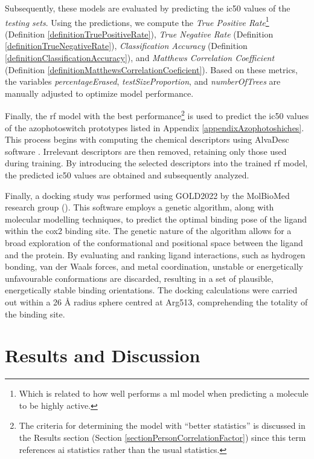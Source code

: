 \documentclass[11pt]{article}
\begin{document}
Subsequently, these models are evaluated by predicting the \gls{ic50} values of the \emph{testing sets}. Using the predictions, we compute the \emph{True Positive Rate}\footnote{Which is related to how well performs a \gls{ml} model when predicting a molecule to be highly active. } (Definition \ref{definitionTruePositiveRate}), \emph{True Negative Rate} (Definition \ref{definitionTrueNegativeRate}), \emph{Classification Accuracy} (Definition \ref{definitionClassificationAccuracy}), and \emph{Matthews Correlation Coefficient} (Definition \ref{definitionMatthewsCorrelationCoeficient}). Based on these metrics, the variables \emph{percentageErased}, \emph{testSizeProportion}, and \emph{numberOfTrees} are manually adjusted to optimize model performance.

Finally, the \gls{rf} model with the best performance\footnote{The criteria for determining the model with “better statistics” is discussed in the Results section (Section \ref{sectionPersonCorrelationFactor}) since this term references \gls{ai} statistics rather than the usual statistics.} is used to predict the \gls{ic50} values of the azophotoswitch prototypes listed in Appendix \ref{appendixAzophotoshiches}. This process begins with computing the chemical descriptors using AlvaDesc software \cite{MauriMolecularDescriptorsBook}. Irrelevant descriptors are then removed, retaining only those used during training. By introducing the selected descriptors into the trained \gls{rf} model, the predicted \gls{ic50} values are obtained and subsequently analyzed.

Finally, a docking study was performed using GOLD2022 \cite{GoldReference} by the MolBioMed research group (\cite{molbiomed}). This software employs a genetic algorithm, along with molecular modelling techniques, to predict the optimal binding pose of the ligand within the \gls{cox2} binding site. The genetic nature of the algorithm allows for a broad exploration of the conformational and positional space between the ligand and the protein. By evaluating and ranking ligand interactions, such as hydrogen bonding, van der Waals forces, and metal coordination, unstable or energetically unfavourable conformations are discarded, resulting in a set of plausible, energetically stable binding orientations. The docking calculations were carried out within a 26 Å radius sphere centred at Arg513, comprehending the totality of the binding site.


\newpage
\section{Results and Discussion}\label{sectionResultsAndDiscussion}
\end{document}
